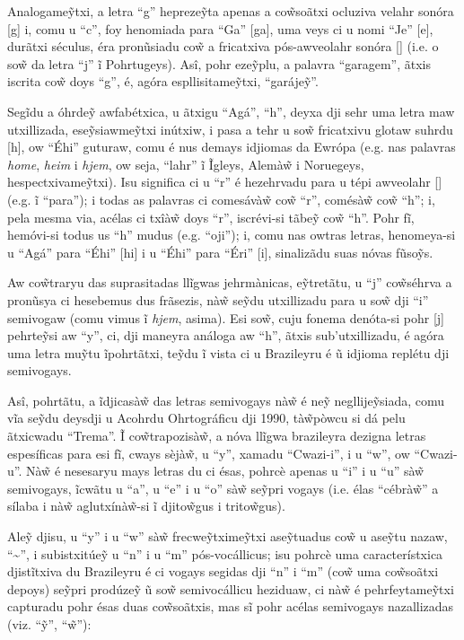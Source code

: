 \documentclass[12pt, a5paper, titlepage]{article}
\begin{document}
\begin{bilingualpages}
    Analogame\~ytxi, a letra ``g'' hepreze\~yta apenas a co\~wsoãtxi ocluziva
    velahr sonóra [g] i, comu u ``c'', foy henomiada para ``Ga'' [ga], uma veys ci
    u nomi ``Je'' [\textyogh e], durãtxi séculus, éra pronũsiadu co\~w a fricatxiva
    pós-awveolahr sonóra [\textyogh] (i.e. o so\~w da letra ``j'' ĩ Pohrtugeys).
    Asî, pohr eze\~yplu, a palavra ``garagem'', ãtxis iscrita co\~w doys ``g'', é,
    agóra espllisitame\~ytxi, ``garáje\~y''.

    Segĩdu a óhrde\~y awfabétxica, u ãtxigu ``Agá'', ``h'', deyxa dji sehr uma
    letra maw utxillizada, ese\~ysiawme\~ytxi inútxiw, i pasa a tehr u so\~w
    fricatxivu glotaw suhrdu [h], ow ``Éhi'' guturaw, comu é nus demays idjiomas da
    Ewrópa (e.g. nas palavras \textit{home}, \textit{heim} i \textit{hjem}, ow
    seja, ``lahr'' ĩ Ĩgleys, Alemà\~w i Noruegeys, hespectxivame\~ytxi). Isu
    significa ci u ``r'' é hezehrvadu para u tépi awveolahr [\textfishhookr] (e.g.
    ĩ ``para''); i todas as palavras ci comesávà\~w co\~w ``r'', comésà\~w co\~w
    ``h''; i, pela mesma via, acélas ci txîà\~w doys ``r'', iscrévi-si tãbe\~y
    co\~w ``h''. Pohr fĩ, hemóvi-si todus us ``h'' mudus (e.g. ``oji''); i, comu
    nas owtras letras, henomeya-si u ``Agá'' para ``Éhi'' [\textepsilon hi] i u
    ``Éhi'' para ``Éri'' [\textepsilon \textfishhookr i], sinalizãdu suas nóvas
    fũso\~ys.

    Aw co\~wtraryu das suprasitadas llĩgwas jehrmànicas, e\~ytretãtu, u ``j''
    co\~wséhrva a pronũsya ci hesebemus dus frãsezis, nà\~w se\~ydu utxillizadu
    para u so\~w dji ``i'' semivogaw (comu vimus ĩ \textit{hjem}, asima). Esi
    so\~w, cuju fonema denóta-si pohr [j] pehrte\~ysi aw ``y'', ci, dji maneyra
    análoga aw ``h'', ãtxis sub'utxillizadu, é agóra uma letra mu\~ytu ĩpohrtãtxi,
    te\~ydu ĩ vista ci u Brazileyru é ũ idjioma replétu dji semivogays.

    Asî, pohrtãtu, a ĩdjicasà\~w das letras semivogays nà\~w é ne\~y
    negllije\~ysiada, comu vĩa se\~ydu deysdji u Acohrdu Ohrtográficu dji 1990,
    tà\~wpòwcu si dá pelu ãtxicwadu ``Trema''. Ĩ co\~wtrapozisà\~w, a nóva llĩgwa
    brazileyra dezigna letras espesíficas para esi fĩ, cways sèjà\~w, u ``y'',
    xamadu ``Cwazi-i'', i u ``w'', ow ``Cwazi-u''. Nà\~w é nesesaryu mays letras du
    ci ésas, pohrcè apenas u ``i'' i u ``u'' sà\~w semivogays, ĩcwãtu u ``a'', u
    ``e'' i u ``o'' sà\~w se\~ypri vogays (i.e. élas ``cébrà\~w'' a sílaba i nà\~w
    aglutxínà\~w-si ĩ djito\~wgus i trito\~wgus).

    Ale\~y djisu, u ``y'' i u ``w'' sà\~w frecwe\~ytxime\~ytxi ase\~ytuadus co\~w u
    ase\~ytu nazaw, ``\textasciitilde'', i subistxitúe\~y u ``n'' i u ``m''
    pós-vocállicus; isu pohrcè uma característxica djistĩtxiva du Brazileyru é ci
    vogays segidas dji ``n'' i ``m'' (co\~w uma co\~wsoãtxi depoys) se\~ypri
    prodúze\~y ũ so\~w semivocállicu heziduaw, ci nà\~w é pehrfeytame\~ytxi
    capturadu pohr ésas duas co\~wsoãtxis, mas sĩ pohr acélas semivogays
    nazallizadas (viz. ``\~y'', ``\~w''):


\end{bilingualpages}
\end{document}

